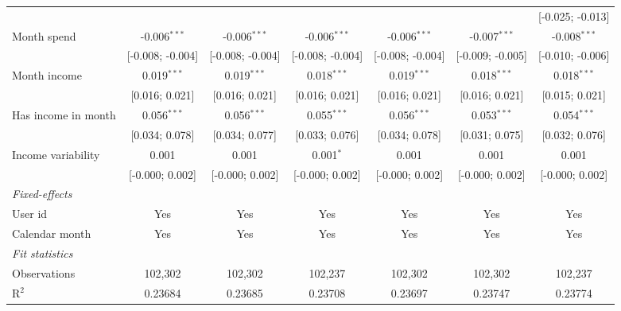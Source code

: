 \begin{table}[htbp]
\begin{threeparttable}[b]
\begin{tabular}{lcccccc}
                                    &                  &                  &                  &                  &                  & [-0.025; -0.013]\\   
         Month spend                & -0.006$^{***}$   & -0.006$^{***}$   & -0.006$^{***}$   & -0.006$^{***}$   & -0.007$^{***}$   & -0.008$^{***}$\\   
                                    & [-0.008; -0.004] & [-0.008; -0.004] & [-0.008; -0.004] & [-0.008; -0.004] & [-0.009; -0.005] & [-0.010; -0.006]\\   
         Month income               & 0.019$^{***}$    & 0.019$^{***}$    & 0.018$^{***}$    & 0.019$^{***}$    & 0.018$^{***}$    & 0.018$^{***}$\\   
                                    & [0.016; 0.021]   & [0.016; 0.021]   & [0.016; 0.021]   & [0.016; 0.021]   & [0.016; 0.021]   & [0.015; 0.021]\\   
         Has income in month        & 0.056$^{***}$    & 0.056$^{***}$    & 0.055$^{***}$    & 0.056$^{***}$    & 0.053$^{***}$    & 0.054$^{***}$\\   
                                    & [0.034; 0.078]   & [0.034; 0.077]   & [0.033; 0.076]   & [0.034; 0.078]   & [0.031; 0.075]   & [0.032; 0.076]\\   
         Income variability         & 0.001            & 0.001            & 0.001$^{*}$      & 0.001            & 0.001            & 0.001\\   
                                    & [-0.000; 0.002]  & [-0.000; 0.002]  & [-0.000; 0.002]  & [-0.000; 0.002]  & [-0.000; 0.002]  & [-0.000; 0.002]\\   
         \midrule
         \emph{Fixed-effects}\\
         User id                    & Yes              & Yes              & Yes              & Yes              & Yes              & Yes\\  
         Calendar month             & Yes              & Yes              & Yes              & Yes              & Yes              & Yes\\  
         \midrule
         \emph{Fit statistics}\\
         Observations               & 102,302          & 102,302          & 102,237          & 102,302          & 102,302          & 102,237\\  
         R$^2$                      & 0.23684          & 0.23685          & 0.23708          & 0.23697          & 0.23747          & 0.23774\\  

\end{tabular}
\end{threeparttable}
\end{table}
